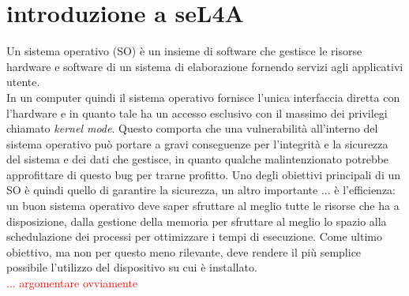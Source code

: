\chapter{introduzione a seL4A}
Un sistema operativo (SO) è un insieme di software che gestisce le risorse hardware e software di un sistema di elaborazione fornendo servizi agli applicativi utente.\\
In un computer quindi il sistema operativo fornisce l'unica interfaccia diretta con l'hardware e in quanto tale ha un accesso esclusivo con il massimo dei privilegi chiamato \textit{kernel mode}. Questo comporta che una vulnerabilità all'interno del sistema operativo può portare a gravi conseguenze per l'integrità e la sicurezza del sistema e dei dati che gestisce, in quanto qualche malintenzionato potrebbe approfittare di questo bug per trarne profitto.
Uno degli obiettivi principali di un SO è quindi quello di garantire la sicurezza, un altro importante ... è l'efficienza: un buon sistema operativo deve saper sfruttare al meglio tutte le risorse che ha a disposizione, dalla gestione della memoria per sfruttare al meglio lo spazio alla schedulazione dei processi per ottimizzare i tempi di esecuzione. Come ultimo obiettivo, ma non per questo meno rilevante, deve rendere il più semplice possibile l'utilizzo del dispositivo su cui è installato.\\
\textcolor{red}{... argomentare ovviamente}

